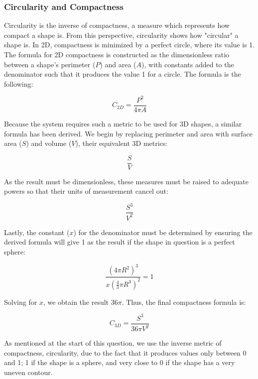\documentclass{bigdata}
\begin{document}
\newpage

\subsubsection{Circularity and Compactness}

Circularity is the inverse of compactness, a measure which represents how compact a shape is. From this perspective, circularity shows how "circular" a shape is. In 2D, compactness is minimized by a perfect circle, where its value is 1. The formula for 2D compactness is constructed as the dimensionless ratio between a shape's perimeter ($P$) and area ($A$), with constants added to the denominator such that it produces the value 1 for a circle. The formula is the following:

\begin{equation}
C_{2D} = \frac{P^2}{4{\pi}A}
\end{equation}

\noindent Because the system requires such a metric to be used for 3D shapes, a similar formula has been derived. We begin by replacing perimeter and area with surface area ($S$) and volume ($V$), their equivalent 3D metrics:

\begin{equation}
\frac{S}{V}
\end{equation}

\noindent As the result must be dimensionless, these measures must be raised to adequate powers so that their units of measurement cancel out:

\begin{equation}
\frac{S^3}{V^2}
\end{equation}

\noindent Lastly, the constant ($x$) for the denominator must be determined by ensuring the derived formula will give 1 as the result if the shape in question is a perfect sphere:

\begin{equation}
\frac{(4\pi R^2)^3}{x(\frac{4}{3}\pi R^3)^2} = 1
\end{equation}

\noindent Solving for $x$, we obtain the result 36$\pi$. Thus, the final compactness formula is:

\begin{equation}
C_{3D} = \frac{S^3}{36\pi V^2}
\end{equation}

\noindent As mentioned at the start of this question, we use the inverse metric of compactness, circularity, due to the fact that it produces values only between 0 and 1; 1 if the shape is a sphere, and very close to 0 if the shape has a very uneven contour.
\end{document}
